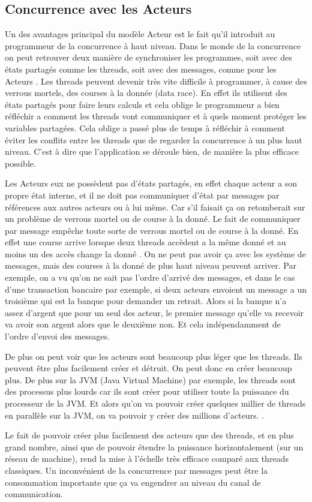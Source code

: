 \documentclass[12pt, a4paper]{article}
\begin{document}
\subsection{Concurrence avec les Acteurs}
Un des avantages principal du modèle Acteur est le fait qu'il introduit au programmeur de la concurrence à haut niveau. Dans le monde de la concurrence on peut retrouver deux manière de synchroniser les programmes, soit avec des états partagés comme les threads, soit avec des messages, comme pour les Acteurs \cite{haller2012actors}. Les threads peuvent devenir très vite difficile à programmer, à cause des verrous mortels, des courses à la donnée (data race). En effet ils utilisent des états partagés pour faire leurs calculs et cela oblige le programmeur a bien réfléchir a comment les threads vont communiquer et à quels moment protéger les variables partagées. Cela oblige a passé plus de temps à réfléchir à comment éviter les conflits entre les threads que de regarder la concurrence à un plus haut niveau. C'est à dire que l'application se déroule bien, de manière la plus efficace possible.

\par Les Acteurs eux ne possèdent pas d'états partagés, en effet chaque acteur a son propre état interne, et il ne doit pas communiquer d'état par messages par références aux autres acteurs ou à lui même. Car s'il faisait ça on retomberait sur un problème de verrous mortel ou de course à la donné. Le fait de communiquer par message empêche toute sorte de verrous mortel ou de course à la donné. En effet une course arrive lorsque deux threads accèdent a la même donné et au moins un des accès change la donné \cite{haller2012actors}. On ne peut pas avoir ça avec les système de messages, mais des courses à la donné de plus haut niveau peuvent arriver. Par exemple, on a vu qu'on ne sait pas l'ordre d'arrivé des messages, et dans le cas d'une transaction bancaire par exemple, si deux acteurs envoient un message a un troisième qui est la banque pour demander un retrait. Alors si la banque n'a assez d'argent que pour un seul des acteur, le premier message qu'elle va recevoir va avoir son argent alors que le deuxième non. Et cela indépendamment de l'ordre d'envoi des messages. 

\par De plus on peut voir que les acteurs sont beaucoup plus léger que les threads. Ils peuvent être plus facilement créer et détruit. On peut donc en créer beaucoup plus. De plus sur la JVM (Java Virtual Machine) par exemple, les threads sont des processus plus lourds car ils sont créer pour utiliser toute la puissance du processeur de la JVM. Et alors qu'on va pouvoir créer quelques millier de threads en parallèle sur la JVM, on va pouvoir y créer des millions d'acteurs. \cite{haller2012actors}.
\par Le fait de pouvoir créer plus facilement des acteurs que des threads, et en plus grand nombre, ainsi que de pouvoir étendre la puissance horizontalement (sur un réseau de machine), rend la mise à l'échelle très efficace comparé aux threads classiques. Un inconvénient de la concurrence par messages peut être la consommation importante que ça va engendrer au niveau du canal de communication.
\end{document}
